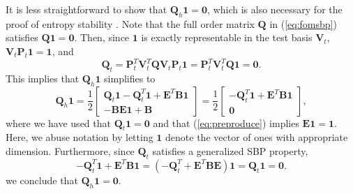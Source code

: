 \documentclass[preprint,10pt]{elsarticle}
\theoremstyle{definition}
\theoremstyle{lemma}
\theoremstyle{theorem}
\theoremstyle{assumption}
\newcommand{\LRp}[1]{\left( #1 \right)}
\begin{document}
It is less straightforward to show that $\bm{Q}_h\bm{1} = \bm{0}$, which is also necessary for the proof of entropy stability \cite{chan2019skew}.  Note that the full order matrix $\bm{Q}$ in (\ref{eq:fomsbp}) satisfies $\bm{Q}\bm{1} = \bm{0}$.  Then, since $\bm{1}$ is exactly representable in the test basis $\bm{V}_t$, $\bm{V}_t\bm{P}_t\bm{1} = \bm{1}$, and
\[
\bm{Q}_t = \bm{P}_t^T\bm{V}_t^T\bm{Q}\bm{V}_t\bm{P}_t\bm{1} = \bm{P}_t^T\bm{V}_t^T\bm{Q}\bm{1} = \bm{0}.
\]
This implies that $\bm{Q}_h\bm{1}$ simplifies to
\[
\bm{Q}_h \bm{1} =  \frac{1}{2}\begin{bmatrix}
\bm{Q}_t \bm{1} - \bm{Q}_t^T \bm{1} + \bm{E}^T\bm{B} \bm{1} \\
- \bm{B}\bm{E} \bm{1} + \bm{B}
\end{bmatrix}=\frac{1}{2}\begin{bmatrix}
- \bm{Q}_t^T \bm{1} + \bm{E}^T\bm{B} \bm{1} \\
\bm{0}
\end{bmatrix},
\]
where we have used that $\bm{Q}_t\bm{1} = \bm{0}$ and that (\ref{eq:preproduce}) implies $\bm{E}\bm{1} = \bm{1}$.   Here, we abuse notation by letting $\bm{1}$ denote the vector of ones with appropriate dimension.  Furthermore, since $\bm{Q}_t$ satisfies a generalized SBP property,
\[
- \bm{Q}_t^T \bm{1} + \bm{E}^T\bm{B} \bm{1} = \LRp{-\bm{Q}_t^T + \bm{E}^T\bm{B}\bm{E}} \bm{1} = \bm{Q}_t \bm{1} = \bm{0}.
\]
we conclude that $\bm{Q}_h\bm{1} = \bm{0}$.
\end{document}
